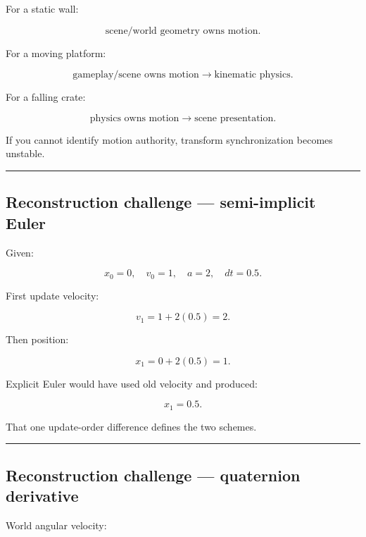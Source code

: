 For a static wall:

\[
\text{scene/world geometry owns motion}.
\]

For a moving platform:

\[
\text{gameplay/scene owns motion}
\rightarrow
\text{kinematic physics}.
\]

For a falling crate:

\[
\text{physics owns motion}
\rightarrow
\text{scene presentation}.
\]

If you cannot identify motion authority, transform synchronization becomes unstable.

\begin{center}\rule{0.5\linewidth}{0.5pt}\end{center}

\subsection{Reconstruction challenge --- semi-implicit Euler}\label{06-engine-ii-ch038-reconstruction-challenge-semi-implicit-euler}

\hypertarget{06-engine-ii-ch038-reconstruction-challenge-semi-implicit-euler}{}

Given:

\[
x_0=0,
\quad
v_0=1,
\quad
a=2,
\quad
dt=0.5.
\]

First update velocity:

\[
v_1
=
1+2(0.5)
=
2.
\]

Then position:

\[
x_1
=
0+2(0.5)
=
1.
\]

Explicit Euler would have used old velocity and produced:

\[
x_1=0.5.
\]

That one update-order difference defines the two schemes.

\begin{center}\rule{0.5\linewidth}{0.5pt}\end{center}

\subsection{Reconstruction challenge --- quaternion derivative}\label{06-engine-ii-ch038-reconstruction-challenge-quaternion-derivative}

\hypertarget{06-engine-ii-ch038-reconstruction-challenge-quaternion-derivative}{}

World angular velocity:


